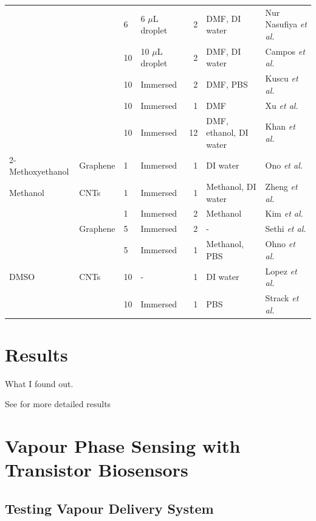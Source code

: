 \documentclass[
  a4paper,
]{scrbook}
\begin{document}
\begin{longtable}[]{@{}llllrll@{}}
& & 6 & 6 \(\mu\)L droplet & 2 & DMF, DI water & Nur Nasufiya
\textit{et al.} \cite{NurNasyifa2020} \\
& & 10 & 10 \(\mu\)L droplet & 2 & DMF, DI water & Campos
\textit{et al.} \cite{Campos2019} \\
& & 10 & Immersed & 2 & DMF, PBS & Kuscu \textit{et al.}
\cite{Kuscu2020} \\
& & 10 & Immersed & 1 & DMF & Xu \textit{et al.} \cite{Xu2017} \\
& & 10 & Immersed & 12 & DMF, ethanol, DI water & Khan \textit{et al.}
\cite{Khan2020} \\
2-Methoxyethanol & Graphene & 1 & Immersed & 1 & DI water & Ono
\textit{et al.} \cite{Ono2020} \\
Methanol & CNTs & 1 & Immersed & 1 & Methanol, DI water & Zheng
\textit{et al.} \cite{Zheng2016} \\
& & 1 & Immersed & 2 & Methanol & Kim \textit{et al.} \cite{Kim2009} \\
& Graphene & 5 & Immersed & 2 & - & Sethi \textit{et al.}
\cite{Sethi2020} \\
& & 5 & Immersed & 1 & Methanol, PBS & Ohno \textit{et al.}
\cite{Ohno2010} \\
DMSO & CNTs & 10 & - & 1 & DI water & Lopez \textit{et al.}
\cite{Lopez2015} \\
& & 10 & Immersed & 1 & PBS & Strack \textit{et al.}
\cite{Strack2013} \\
\bottomrule()
\end{longtable}

\newpage
{}


\hypertarget{results}{%
\chapter{Results}\label{results}}

What I found out.

See for more detailed results


\hypertarget{vapour-phase-sensing-with-transistor-biosensors}{%
\chapter{Vapour Phase Sensing with Transistor
Biosensors}\label{vapour-phase-sensing-with-transistor-biosensors}}

\hypertarget{testing-vapour-delivery-system}{%
\section{Testing Vapour Delivery
System}\label{testing-vapour-delivery-system}}
\end{document}
